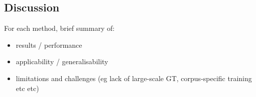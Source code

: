 \subsection{Discussion}
\label{sec:discussion}


For each method, brief summary of:

\begin{itemize}
\item results / performance
\item applicability / generalisability
\item limitations and challenges (eg lack of large-scale GT, corpus-specific training etc etc)
\end{itemize}

